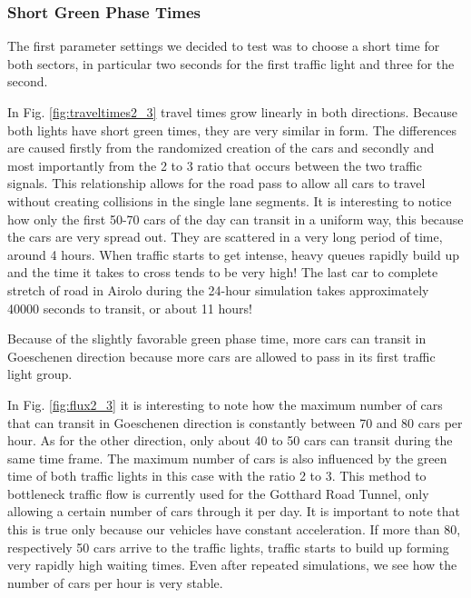 \documentclass[11pt,a4paper,parskip=half-]{article}
\begin{document}
\subsubsection{Short Green Phase Times}
The first parameter settings we decided to test was to choose a short time for both sectors, in particular two seconds for the first traffic light and three for the second. 






In Fig. \ref{fig:traveltimes2_3} travel times grow linearly in both directions. Because both lights have short green times, they are very similar in form. The differences are caused firstly from the randomized creation of the cars and secondly and most importantly from the 2 to 3 ratio that occurs between the two traffic signals. This relationship allows for the road pass to allow all cars to travel without creating collisions in the single lane segments. It is interesting to notice how only the first 50-70 cars of the day can transit in a uniform way, this because the cars are very spread out. They are scattered in a very long period of time, around 4 hours. When traffic starts to get intense, heavy queues rapidly build up and the time it takes to cross tends to be very high! The last car to complete stretch of road in Airolo during the 24-hour simulation takes approximately 40000 seconds to transit, or about 11 hours!

Because of the slightly favorable green phase time, more cars can transit in Goeschenen direction because more cars are allowed to pass in its first traffic light group. 






In Fig. \ref{fig:flux2_3} it is interesting to note how the maximum number of cars that can transit in Goeschenen direction is constantly between 70 and 80 cars per hour. As for the other direction, only about 40 to 50 cars can transit during the same time frame. The maximum number of cars is also influenced by the green time of both traffic lights in this case with the ratio 2 to 3. This method to bottleneck traffic flow is currently used for the Gotthard Road Tunnel, only allowing a certain number of cars through it per day. It is important to note that this is true only because our vehicles have constant acceleration. If more than 80, respectively 50 cars arrive to the traffic lights, traffic starts to build up forming very rapidly high waiting times. Even after repeated simulations, we see how the number of cars per hour is very stable. 
\end{document}
